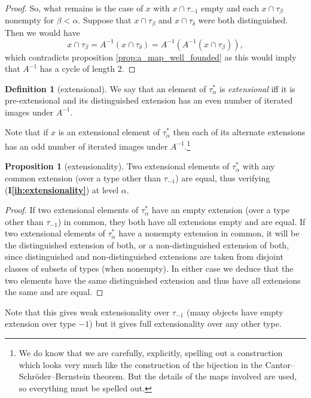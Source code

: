 \documentclass{article}
\theoremstyle{definition}
\newtheorem{proposition}[theorem]{Proposition}
\newtheorem{definition}[theorem]{Definition}
\theoremstyle{remark}
\newcommand{\ihref}[1]{(\textbf{I\ref{#1}})}
\begin{document}
{\begin{proof}
So, what remains is the case of $x$ with $x \cap \tau_{-1}$ empty and each $x \cap \tau_\beta$ nonempty for $\beta<\alpha$.
Suppose that $x \cap \tau_\beta$ and $x \cap \tau_\delta$ were both distinguished.
Then we would have
$$ x \cap \tau_\beta = A^{-1}(x \cap \tau_\delta) = A^{-1}(A^{-1}(x \cap \tau_\beta)), $$
which contradicts proposition \ref{prop:a_map_well_founded} as this would imply that $A^{-1}$ has a cycle of length 2.
\end{proof}

\begin{definition}[extensional]\label{def:extensional}
We say that an element of $\tau_\alpha^*$ is {\em extensional\/} iff
it is pre-extensional and its distinguished extension has an even number of iterated images under $A^{-1}$.
\end{definition}

Note that if $x$ is  an extensional element of $\tau_\alpha^*$ then each of its alternate extensions has an odd number of iterated images under $A^{-1}$.\footnote{We do know that we are carefully, explicitly, spelling out a construction which looks very much
like the construction of the bijection in the Cantor--Schr\"oder--Bernstein theorem.  But the details of the maps involved are used, so everything must be spelled out.}


\begin{proposition}[extensionality]\label{prop:extensionality}
Two extensional elements of $\tau_\alpha^*$ with any common extension (over a type other than $\tau_{-1}$) are equal, thus verifying \ihref{ih:extensionality} at level $\alpha$.
\end{proposition}
\begin{proof}
If two extensional elements of $\tau_\alpha^*$ have an empty extension (over a type other than $\tau_{-1}$) in common, they both have all extensions empty and are equal.  If two extensional elements of $\tau_\alpha^*$ have a nonempty extension in common, it will be the distinguished extension of both, or a non-distinguished extension of both, since distinguished and non-distinguished extensions are taken from disjoint classes of subsets of types (when nonempty).
In either case we deduce that the two elements have the same distinguished extension and thus have all extensions the same and are equal.
\end{proof}
Note that this gives weak extensionality over $\tau_{-1}$ (many objects have empty extension over type $-1$) but it gives full extensionality over any other type.


}
\end{document}
